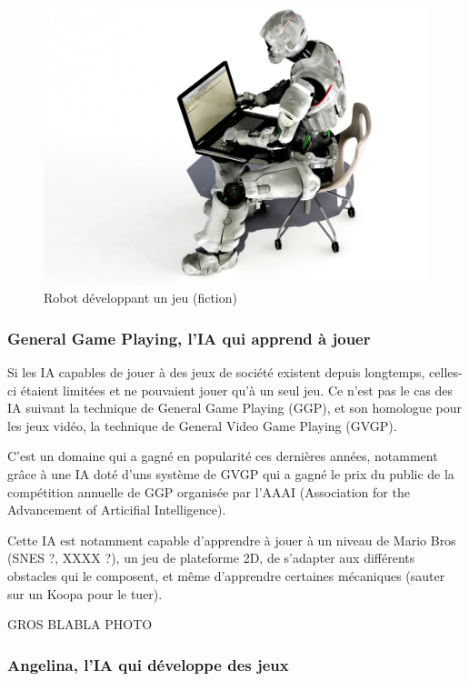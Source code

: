 \documentclass[a4paper, 12pt]{article} %
\begin{document}
\begin{figure}[!h]%
	\begin{center} 
		\includegraphics[width=0.60\columnwidth]{images/robotdeveloping.jpg}%
		\caption{Robot développant un jeu (fiction)}%
	\end{center}
\end{figure}

\newpage
\subsubsection{General Game Playing, l'IA qui apprend à jouer}

Si les IA capables de jouer à des jeux de société existent depuis longtemps, celles-ci étaient limitées et ne pouvaient jouer qu’à un seul jeu. Ce n’est pas le cas des IA suivant la technique de General Game Playing (GGP), et son homologue pour les jeux vidéo, la technique de General Video Game Playing (GVGP).

C’est un domaine qui a gagné en popularité ces dernières années, notamment grâce à une IA doté d’uns système de GVGP qui a gagné le prix du public de la compétition annuelle de GGP organisée par l’AAAI (Association for the Advancement of Articifial Intelligence).

Cette IA est notamment capable d’apprendre à jouer à un niveau de Mario Bros (SNES ?, XXXX ?), un jeu de plateforme 2D, de s’adapter aux différents obstacles qui le composent, et même d’apprendre certaines mécaniques (sauter sur un Koopa pour le tuer).

GROS BLABLA
PHOTO


\newpage
\subsubsection{Angelina, l’IA qui développe des jeux}
\end{document}
